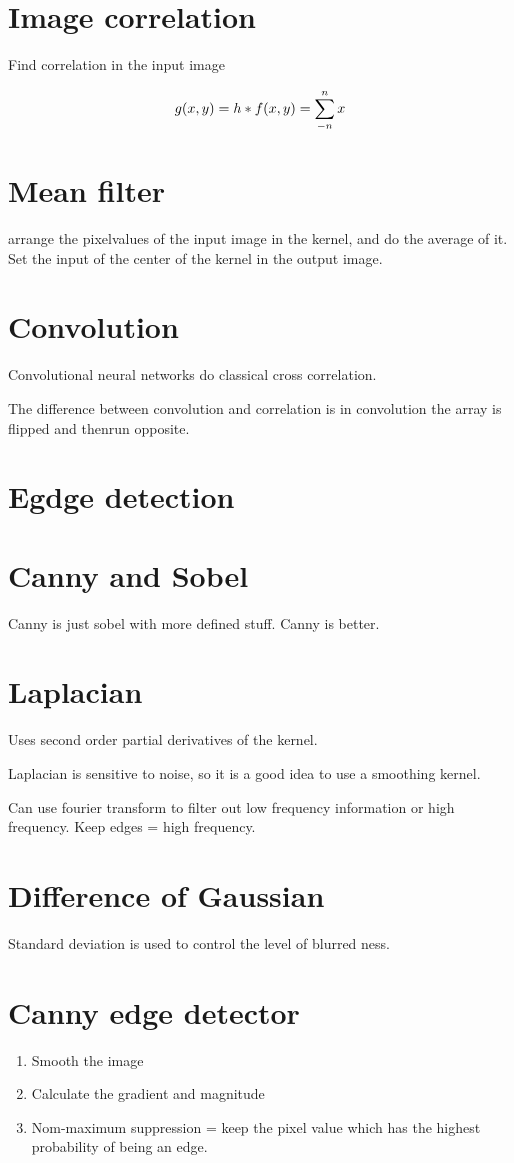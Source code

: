 \documentclass{article}
\begin{document}
\section{Image correlation}
Find correlation in the input image

\[
	g(x,y) = h * f(x,y) = \sum_{-n}^{n}{x} \hfill
\] 

\section{Mean filter}
arrange the pixelvalues of the input image in the kernel, and do the average of it. Set the input of the center of the kernel in the output image.

\section{Convolution}
Convolutional neural networks do classical cross correlation.



The difference between convolution and correlation is in convolution the array is flipped and thenrun opposite. 

\section{Egdge detection}
\section{Canny and Sobel}
Canny is just sobel with more defined stuff. Canny is better.


\section{Laplacian}
Uses second order partial derivatives of the kernel.

Laplacian is sensitive to noise, so it is a good idea to use a smoothing kernel.


Can use fourier transform to filter out low frequency information or high frequency. Keep edges = high frequency.


\section{Difference of Gaussian}
Standard deviation is used to control the level of blurred ness. 



\section{Canny edge detector}
\begin{enumerate}
	\item Smooth the image
	\item Calculate the gradient and magnitude
	\item Nom-maximum suppression = keep the pixel value which has the highest probability of being an edge. 
\end{enumerate}
\end{document}
